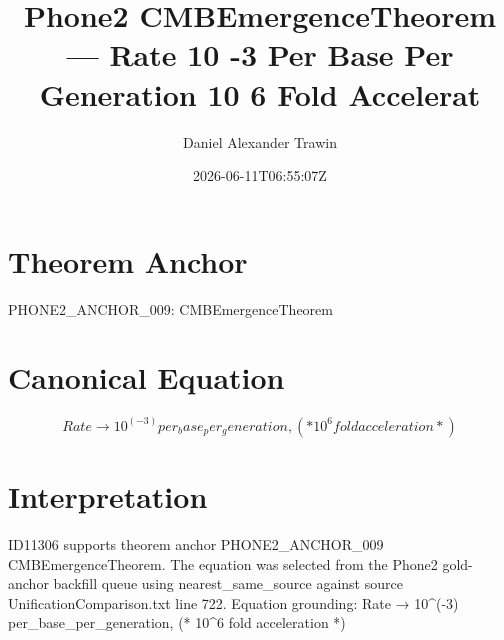 \documentclass[11pt]{article}
\title{Phone2 CMBEmergenceTheorem — Rate 10 -3 Per Base Per Generation 10 6 Fold Accelerat}
\author{Daniel Alexander Trawin}
\date{2026-06-11T06:55:07Z}
\begin{document}
\maketitle
\section*{Theorem Anchor}
PHONE2_ANCHOR_009: CMBEmergenceTheorem
\section*{Canonical Equation}
\[
Rate → 10^(-3) per_base_per_generation, (* 10^6 fold acceleration *)
\]
\section*{Interpretation}
ID11306 supports theorem anchor PHONE2_ANCHOR_009 CMBEmergenceTheorem. The equation was selected from the Phone2 gold-anchor backfill queue using nearest_same_source against source UnificationComparison.txt line 722. Equation grounding: Rate → 10^(-3) per_base_per_generation, (* 10^6 fold acceleration *)
\end{document}

